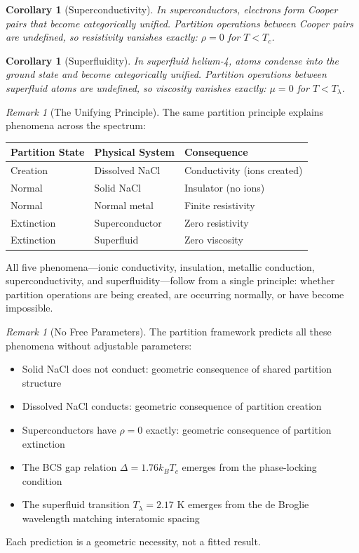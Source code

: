 \documentclass[twocolumn,10pt,a4paper]{article}
\newtheorem{corollary}[theorem]{Corollary}
\theoremstyle{definition}
\theoremstyle{remark}
\newtheorem{remark}[theorem]{Remark}
\begin{document}
\begin{corollary}[Superconductivity]
\label{cor:superconductivity}
In superconductors, electrons form Cooper pairs that become categorically unified. Partition operations between Cooper pairs are undefined, so resistivity vanishes exactly: $\rho = 0$ for $T < T_c$.
\end{corollary}

\begin{corollary}[Superfluidity]
\label{cor:superfluidity}
In superfluid helium-4, atoms condense into the ground state and become categorically unified. Partition operations between superfluid atoms are undefined, so viscosity vanishes exactly: $\mu = 0$ for $T < T_\lambda$.
\end{corollary}

\begin{remark}[The Unifying Principle]
The same partition principle explains phenomena across the spectrum:

\begin{center}
\begin{tabular}{lll}
\toprule
Partition State & Physical System & Consequence \\
\midrule
Creation & Dissolved NaCl & Conductivity (ions created) \\
Normal & Solid NaCl & Insulator (no ions) \\
Normal & Normal metal & Finite resistivity \\
Extinction & Superconductor & Zero resistivity \\
Extinction & Superfluid & Zero viscosity \\
\bottomrule
\end{tabular}
\end{center}

All five phenomena---ionic conductivity, insulation, metallic conduction, superconductivity, and superfluidity---follow from a single principle: whether partition operations are being created, are occurring normally, or have become impossible.
\end{remark}

\begin{remark}[No Free Parameters]
The partition framework predicts all these phenomena without adjustable parameters:
\begin{itemize}
    \item Solid NaCl does not conduct: geometric consequence of shared partition structure
    \item Dissolved NaCl conducts: geometric consequence of partition creation
    \item Superconductors have $\rho = 0$ exactly: geometric consequence of partition extinction
    \item The BCS gap relation $\Delta = 1.76 k_B T_c$ emerges from the phase-locking condition
    \item The superfluid transition $T_\lambda = 2.17$ K emerges from the de Broglie wavelength matching interatomic spacing
\end{itemize}

Each prediction is a geometric necessity, not a fitted result.
\end{remark}
\end{document}
